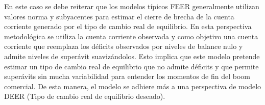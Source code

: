 \documentclass[12pt,letterpaper]{article}
\begin{document}
En este caso se debe reiterar que los modelos típicos FEER generalmente utilizan valores norma y subyacentes para estimar el cierre de brecha de la cuenta corriente generado por el tipo de cambio real de equilibrio. En esta perspectiva metodológica se utiliza la cuenta corriente observada y como objetivo una cuenta corriente que reemplaza los déficits observados por niveles de balance nulo y admite niveles de superávit suavizándolos. Esto implica que este modelo pretende estimar un tipo de cambio real de equilibrio que no admite déficits y que permite superávits sin mucha variabilidad para entender los momentos de fin del boom comercial. De esta manera, el modelo se adhiere más a una perspectiva de modelo DEER (Tipo de cambio real de equilibrio deseado).


\end{document}
